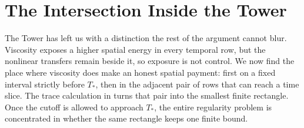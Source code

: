\clearpage
\section{The Intersection Inside the Tower}\label{sec:TheIntersectionInsideTheTower}

The Tower has left us with a distinction the rest of the argument cannot blur.
Viscosity exposes a higher spatial energy in every temporal row, but the
nonlinear transfers remain beside it, so exposure is not control.  We now find
the place where viscosity does make an honest spatial payment: first on a
fixed interval strictly before \(T_*\), then in the adjacent pair of rows that
can reach a time slice.  The trace calculation in
 turns that pair into the smallest finite
rectangle.  Once
the cutoff is allowed to approach \(T_*\), the entire regularity problem is
concentrated in whether the same rectangle keeps one finite bound.





